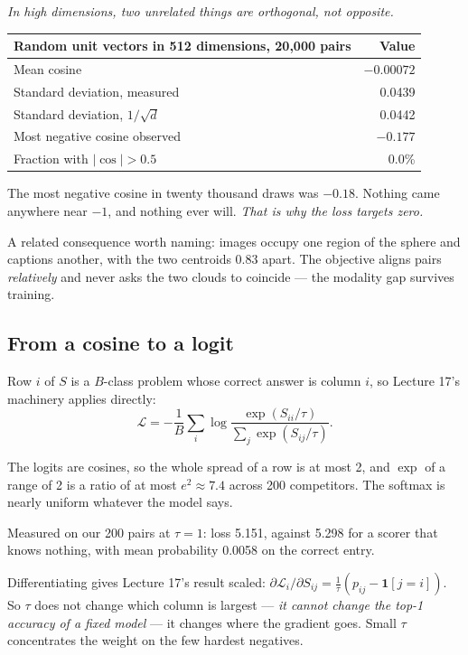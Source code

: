 \documentclass[11pt,a4paper]{article}
\begin{document}
\emph{In high dimensions, two unrelated things are orthogonal, not opposite.}

\begin{center}
\small
\begin{tabular}{lr}
\toprule
\textbf{Random unit vectors in 512 dimensions, 20{,}000 pairs} &
\textbf{Value} \\
\midrule
Mean cosine & $-0.00072$ \\
Standard deviation, measured & 0.0439 \\
Standard deviation, $1/\sqrt d$ & 0.0442 \\
Most negative cosine observed & $-0.177$ \\
Fraction with $|\cos| > 0.5$ & 0.0\% \\
\bottomrule
\end{tabular}
\end{center}

The most negative cosine in twenty thousand draws was $-0.18$. Nothing came
anywhere near $-1$, and nothing ever will. \emph{That is why the loss targets
zero.}

A related consequence worth naming: images occupy one region of the sphere and
captions another, with the two centroids 0.83 apart. The objective aligns pairs
\emph{relatively} and never asks the two clouds to coincide --- the modality
gap survives training.

\subsection{From a cosine to a logit}

Row $i$ of $S$ is a $B$-class problem whose correct answer is column $i$, so
Lecture 17's machinery applies directly:
\[ \mathcal{L} = -\frac{1}{B}\sum_i
   \log\frac{\exp(S_{ii}/\tau)}{\sum_j \exp(S_{ij}/\tau)}. \]

\begin{failbox}[title={Failure condition --- why $\tau = 1$ cannot work}]
The logits are cosines, so the whole spread of a row is at most 2, and
$\exp$ of a range of 2 is a ratio of at most $e^2 \approx 7.4$ across 200
competitors. The softmax is nearly uniform whatever the model says.

Measured on our 200 pairs at $\tau = 1$: loss 5.151, against 5.298 for a scorer
that knows nothing, with mean probability 0.0058 on the correct entry.
\end{failbox}

Differentiating gives Lecture 17's result scaled:
$\partial\mathcal{L}_i/\partial S_{ij} = \frac{1}{\tau}(p_{ij} - \mathbf{1}[j
= i])$. So $\tau$ does not change which column is largest --- \emph{it cannot
change the top-1 accuracy of a fixed model} --- it changes where the gradient
goes. Small $\tau$ concentrates the weight on the few hardest negatives.
\end{document}
